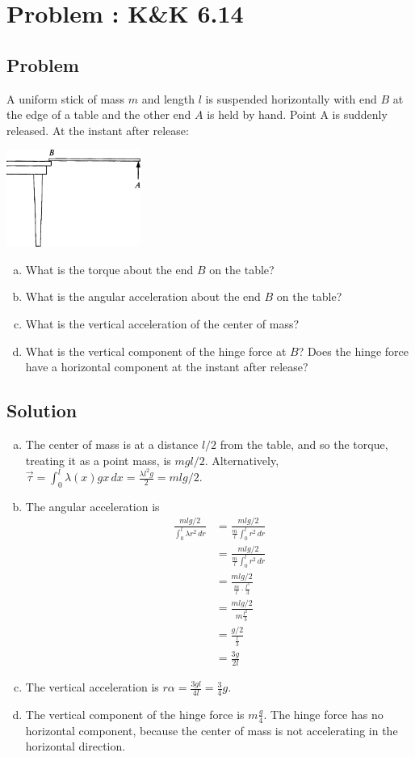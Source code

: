 \documentclass[solutions]{esg8012pset}
\date{Month Day\csname latex@error\endcsname {Date not yet decided}}
\renewcommand{\d}{\,d}
\begin{document}
\section{Problem \thesection: K\&K 6.14}
\subsection{Problem}
  A uniform stick of mass $m$ and length $l$ is suspended horizontally with end $B$ at the edge of a table and the other end $A$ is held by hand. Point A is suddenly released. At the instant after release:
  \begin{center}\includegraphics[width=0.33\textwidth]{ps09_1}\end{center}
  \begin{enumerate}[(a)]
    \item What is the torque about the end $B$ on the table?
    \item What is the angular acceleration about the end $B$ on the table?
    \item What is the vertical acceleration of the center of mass?
    \item What is the vertical component of the hinge force at $B$? Does the hinge force have a horizontal component at the instant after release?
  \end{enumerate}
\subsection{Solution}
  \begin{enumerate}[(a)]
    \item The center of mass is at a distance $l / 2$ from the table, and so the torque, treating it as a point mass, is $m g l / 2$.  Alternatively, $\vec \tau = \int_0^l \lambda(x) g x \d x = \frac{\lambda l^2 g}{2} = m l g / 2$.
    \item The angular acceleration is \begin{align*}
      \frac{m l g / 2}{\int_0^l \lambda r^2 \d r} & = \frac{m l g / 2}{\frac{m}{l} \int_0^l r^2 \d r } \\
      & = \frac{m l g / 2}{\frac{m}{l} \int_0^l r^2 \d r } \\
      & = \frac{m l g / 2}{\frac{m}{l} \cdot \frac{l^3}{3} } \\
      & = \frac{m l g / 2}{m \frac{l^2}{3} } \\
      & = \frac{g / 2}{\frac{l}{3} } \\
      & = \frac{3 g}{2 l}
      \end{align*}
    \item The vertical acceleration is $r\alpha = \frac{3 g l}{4 l} = \frac{3}{4}g$.
    \item The vertical component of the hinge force is $m\frac{g}{4}$.  The hinge force has no horizontal component, because the center of mass is not accelerating in the horizontal direction.
  \end{enumerate}
\end{document}
